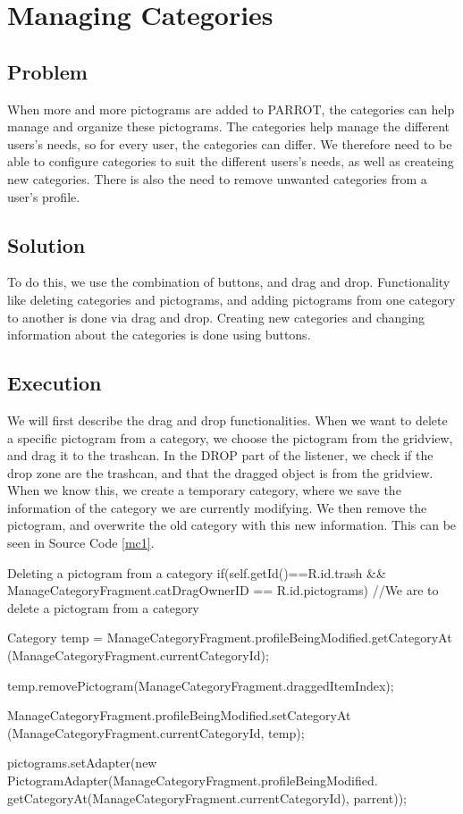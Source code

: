 \section{Managing Categories} %
\label{mc}
\subsection*{Problem}
When more and more pictograms are added to PARROT, the categories can help manage and organize these pictograms. 
The categories help manage the different users's needs, so for every user, the categories can differ. 
We therefore need to be able to configure categories to suit the different users's needs, as well as createing new categories. 
There is also the need to remove unwanted categories from a user's profile.


\subsection*{Solution}
To do this, we use the combination of buttons, and drag and drop. 
Functionality like deleting categories and pictograms, and adding pictograms from one category to another is done via drag and drop. 
Creating new categories and changing information about the categories is done using buttons. 


\subsection*{Execution}
We will first describe the drag and drop functionalities. 
When we want to delete a specific pictogram from a category, we choose the pictogram from the gridview, and drag it to the trashcan. 
In the DROP part of the listener, we check if the drop zone are the trashcan, and that the dragged object is from the gridview.
When we know this, we create a temporary category, where we save the information of the category we are currently modifying. We then remove the pictogram, and overwrite the old category with this new information.
This can be seen in Source Code \ref{mc1}.

\begin{source}[{mc1}]{Deleting a pictogram from a category}
if(self.getId()==R.id.trash && ManageCategoryFragment.catDragOwnerID == R.id.pictograms) //We are to delete a pictogram from a category
				{
					Category temp = ManageCategoryFragment.profileBeingModified.getCategoryAt
						(ManageCategoryFragment.currentCategoryId);
					
					temp.removePictogram(ManageCategoryFragment.draggedItemIndex);
					
					ManageCategoryFragment.profileBeingModified.setCategoryAt
						(ManageCategoryFragment.currentCategoryId, temp);
					
					pictograms.setAdapter(new PictogramAdapter(ManageCategoryFragment.profileBeingModified.
						getCategoryAt(ManageCategoryFragment.currentCategoryId), parrent));
				}
\end{source}

